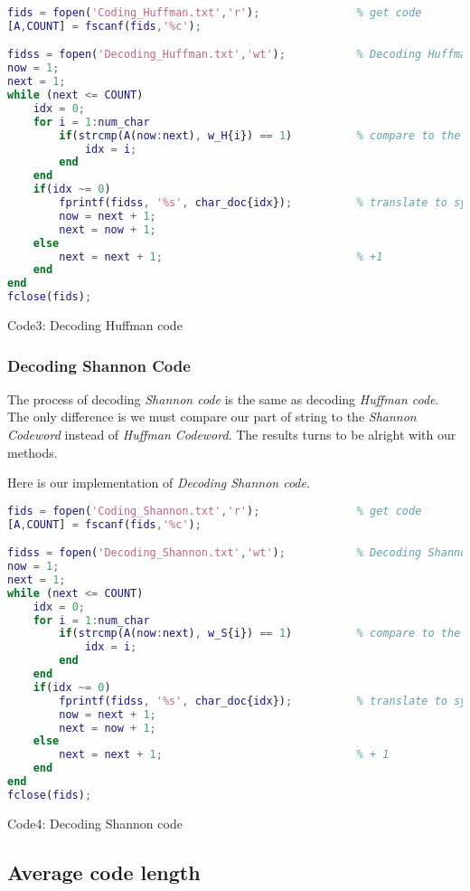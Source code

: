\documentclass[12pt]{article} %
\numberwithin{equation}{section}
\begin{document}
\begin{lstlisting}[language=matlab]
fids = fopen('Coding_Huffman.txt','r');               % get code
[A,COUNT] = fscanf(fids,'%c');

fidss = fopen('Decoding_Huffman.txt','wt');           % Decoding Huffman code
now = 1;
next = 1;
while (next <= COUNT)
    idx = 0;
    for i = 1:num_char
        if(strcmp(A(now:next), w_H{i}) == 1)          % compare to the codewords
            idx = i;
        end
    end
    if(idx ~= 0)
        fprintf(fidss, '%s', char_doc{idx});          % translate to symbols
        now = next + 1;
        next = now + 1;
    else
        next = next + 1;                              % +1
    end
end
fclose(fids);
\end{lstlisting}
\begin{center}
  Code3: Decoding Huffman code
\end{center}


\subsubsection{Decoding Shannon Code}

The process of decoding \emph{Shannon code} is the same as decoding \emph{Huffman code}. The only difference is we must compare our part of string to the \emph{Shannon Codeword} instead of \emph{Huffman Codeword}. The results turns to be alright with our methods.

Here is our implementation of \emph{Decoding Shannon code}.
\newpage
\begin{lstlisting}[language=matlab]
fids = fopen('Coding_Shannon.txt','r');               % get code
[A,COUNT] = fscanf(fids,'%c');

fidss = fopen('Decoding_Shannon.txt','wt');           % Decoding Shannon code
now = 1;
next = 1;
while (next <= COUNT)
    idx = 0;
    for i = 1:num_char
        if(strcmp(A(now:next), w_S{i}) == 1)          % compare to the codewords
            idx = i;
        end
    end
    if(idx ~= 0)
        fprintf(fidss, '%s', char_doc{idx});          % translate to symbols
        now = next + 1;
        next = now + 1;
    else
        next = next + 1;                              % + 1
    end
end
fclose(fids);
\end{lstlisting}
\begin{center}
  Code4: Decoding Shannon code
\end{center}

\subsection{Average code length}
\end{document}
